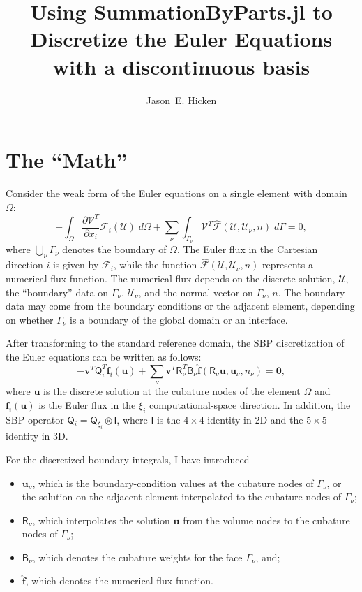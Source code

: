 \documentclass[11pt]{article} %
\title{Using SummationByParts.jl to Discretize the Euler Equations with a
  discontinuous basis}
\author{Jason~E. Hicken}
\newcommand{\vfc}[1]{\ensuremath{\mathcal{#1}}}
\newcommand{\mat}[1]{\ensuremath{\mathsf{#1}}}
\newcommand{\Q}[1]{\mat{Q}_{#1}}
\newcommand{\B}[0]{\mat{B}}
\newcommand{\R}[0]{\mat{R}}
\begin{document}
\maketitle

\section*{The ``Math''}

Consider the weak form of the Euler equations on a single element with domain
$\Omega$:
\begin{equation*}
  - \int_{\Omega}  \frac{\partial \vfc{V}^{T}}{\partial x_{i}} 
  \vfc{F}_{i}(\vfc{U}) \; d\Omega
  + \sum_{\nu} \int_{\Gamma_{\nu}} \vfc{V}^{T} \hat{\vfc{F}}(\vfc{U},\vfc{U}_{\nu},n)  \; d\Gamma
  = 0,
\end{equation*}
where $\bigcup_{\nu} \Gamma_{\nu}$ denotes the boundary of $\Omega$.  The Euler
flux in the Cartesian direction $i$ is given by $\vfc{F}_{i}$, while the
function $\hat{\vfc{F}}(\vfc{U}, \vfc{U}_{\nu}, n)$ represents a numerical flux
function.  The numerical flux depends on the discrete solution, $\vfc{U}$, the
``boundary'' data on $\Gamma_{\nu}$, $\vfc{U}_{\nu}$, and the normal vector on
$\Gamma_{\nu}$, $n$.  The boundary data may come from the boundary conditions or
the adjacent element, depending on whether $\Gamma_{\nu}$ is a boundary of the
global domain or an interface.

After transforming to the standard reference domain, the SBP discretization of
the Euler equations can be written as follows:
\begin{equation*}
  -\bm{v}^{T} \Q{i}^{T} \bm{f}_{i}(\bm{u}) + \sum_{\nu} \bm{v}^{T} \R_{\nu}^{T} \B_{\nu}
  \hat{\bm{f}}(\R_{\nu} \bm{u}, \bm{u}_{\nu},n_{\nu}) = \bm{0},
\end{equation*}
where $\bm{u}$ is the discrete solution at the cubature nodes of the element
$\Omega$ and $\bm{f}_{i}(\bm{u})$ is the Euler flux in the $\xi_{i}$
computational-space direction.  In addition, the SBP operator $\Q{i} =
\Q{\xi_{i}} \otimes \mat{I}$, where $\mat{I}$ is the $4\times 4$ identity in 2D
and the $5\times 5$ identity in 3D.

For the discretized boundary integrals, I have introduced 
\begin{itemize}
\item $\bm{u}_{\nu}$, which is the boundary-condition values at the cubature
  nodes of $\Gamma_{\nu}$, or the solution on the adjacent element interpolated
  to the cubature nodes of $\Gamma_{\nu}$;
\item $\R_{\nu}$, which interpolates the solution $\bm{u}$ from the volume nodes
  to the cubature nodes of $\Gamma_{\nu}$;
\item $\B_{\nu}$, which denotes the cubature weights for the face $\Gamma_{\nu}$, and;
\item $\hat{\bm{f}}$, which denotes the numerical flux function.
\end{itemize}
\end{document}
